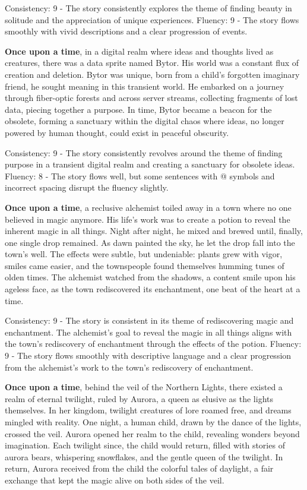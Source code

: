 \documentclass{article}
\begin{document}
Consistency: 9 - The story consistently explores the theme of finding beauty in solitude and the appreciation of unique experiences.
Fluency: 9 - The story flows smoothly with vivid descriptions and a clear progression of events.

\textbf{Once upon a time}, in a digital realm where ideas and thoughts lived as creatures, there was a data sprite named Bytor. His world was a constant flux of creation and deletion. Bytor was unique, born from a child's forgotten imaginary friend, he sought meaning in this transient world. He embarked on a journey through fiber-optic forests and across server streams, collecting fragments of lost data, piecing together a purpose. In time, Bytor became a beacon for the obsolete, forming a sanctuary within the digital chaos where ideas, no longer powered by human thought, could exist in peaceful obscurity.

Consistency: 9 - The story consistently revolves around the theme of finding purpose in a transient digital realm and creating a sanctuary for obsolete ideas.
Fluency: 8 - The story flows well, but some sentences with @ symbols and incorrect spacing disrupt the fluency slightly.

\textbf{Once upon a time}, a reclusive alchemist toiled away in a town where no one believed in magic anymore. His life's work was to create a potion to reveal the inherent magic in all things. Night after night, he mixed and brewed until, finally, one single drop remained. As dawn painted the sky, he let the drop fall into the town's well. The effects were subtle, but undeniable: plants grew with vigor, smiles came easier, and the townspeople found themselves humming tunes of olden times. The alchemist watched from the shadows, a content smile upon his ageless face, as the town rediscovered its enchantment, one beat of the heart at a time.

Consistency: 9 - The story is consistent in its theme of rediscovering magic and enchantment. The alchemist's goal to reveal the magic in all things aligns with the town's rediscovery of enchantment through the effects of the potion.
Fluency: 9 - The story flows smoothly with descriptive language and a clear progression from the alchemist's work to the town's rediscovery of enchantment.

\textbf{Once upon a time}, behind the veil of the Northern Lights, there existed a realm of eternal twilight, ruled by Aurora, a queen as elusive as the lights themselves. In her kingdom, twilight creatures of lore roamed free, and dreams mingled with reality. One night, a human child, drawn by the dance of the lights, crossed the veil. Aurora opened her realm to the child, revealing wonders beyond imagination. Each twilight since, the child would return, filled with stories of aurora bears, whispering snowflakes, and the gentle queen of the twilight. In return, Aurora received from the child the colorful tales of daylight, a fair exchange that kept the magic alive on both sides of the veil.
\end{document}
